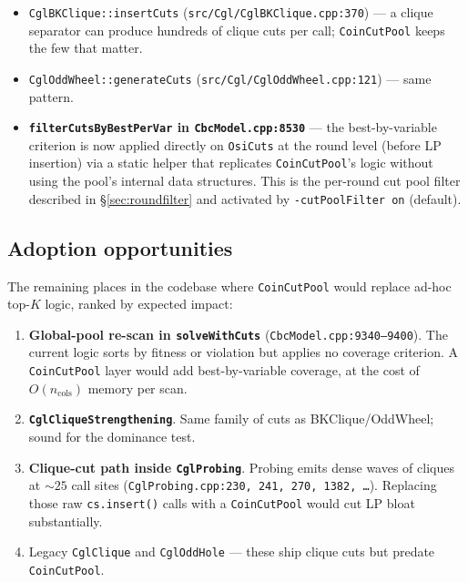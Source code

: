 \documentclass[11pt,a4paper]{article}
\begin{document}
\begin{itemize}[leftmargin=*]
  \item \texttt{CglBKClique::insertCuts}
        (\texttt{src/Cgl/CglBKClique.cpp:370}) --- a clique
        separator can produce hundreds of clique cuts per call;
        \texttt{CoinCutPool} keeps the few that matter.
  \item \texttt{CglOddWheel::generateCuts}
        (\texttt{src/Cgl/CglOddWheel.cpp:121}) --- same pattern.
  \item \textbf{\texttt{filterCutsByBestPerVar} in
        \texttt{CbcModel.cpp:8530}} --- the best-by-variable criterion
        is now applied directly on \texttt{OsiCuts} at the round
        level (before LP insertion) via a static helper that replicates
        \texttt{CoinCutPool}'s logic without using the pool's internal
        data structures.  This is the per-round cut pool filter
        described in \S\ref{sec:roundfilter} and activated by
        \texttt{-cutPoolFilter on} (default).
\end{itemize}

\subsection*{Adoption opportunities}

The remaining places in the codebase where \texttt{CoinCutPool}
would replace ad-hoc top-$K$ logic, ranked by expected impact:

\begin{enumerate}[leftmargin=*]
  \item \textbf{Global-pool re-scan in \texttt{solveWithCuts}}
        (\texttt{CbcModel.cpp:9340--9400}).  The current logic
        sorts by fitness or violation but applies no coverage
        criterion.  A \texttt{CoinCutPool} layer would add
        best-by-variable coverage, at the cost of
        $O(n_{\text{cols}})$ memory per scan.
  \item \textbf{\texttt{CglCliqueStrengthening}}.  Same family of
        cuts as BKClique/OddWheel; sound for the dominance test.
  \item \textbf{Clique-cut path inside \texttt{CglProbing}}.
        Probing emits dense waves of cliques at $\sim 25$ call
        sites (\texttt{CglProbing.cpp:230, 241, 270, 1382, \dots}).
        Replacing those raw \texttt{cs.insert()} calls with a
        \texttt{CoinCutPool} would cut LP bloat substantially.
  \item Legacy \texttt{CglClique} and \texttt{CglOddHole} ---
        these ship clique cuts but predate \texttt{CoinCutPool}.
\end{enumerate}
\end{document}
